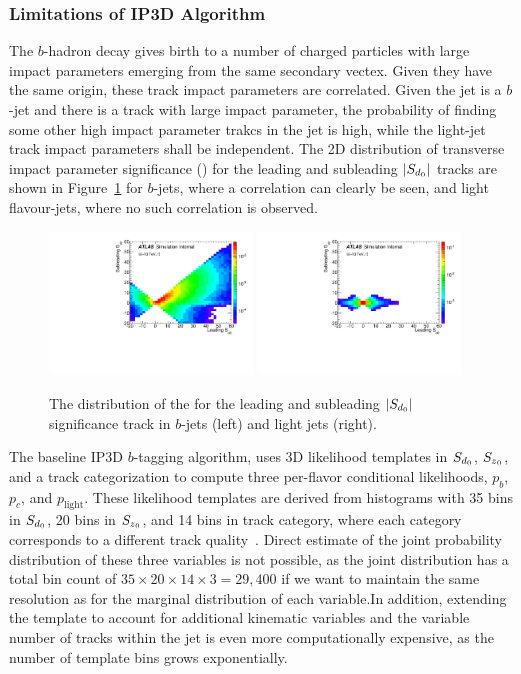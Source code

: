\subsubsection{Limitations of IP3D Algorithm}

The $b$-hadron decay gives birth to a number of charged particles with large impact parameters emerging from the same secondary vectex. Given they have the same origin, these track impact parameters are correlated. Given the jet is a $b$-jet and there is a track with large impact parameter, the probability of finding some other high impact parameter trakcs in the jet is high, while the light-jet track impact parameters shall be independent. The 2D distribution of transverse impact parameter significance (\sdip) for the leading and subleading $|S_{d{_0}}|$ tracks are shown in Figure~\ref{fig:ip_corr} for $b$-jets, where a correlation can clearly be seen, and light flavour-jets, where no such correlation is observed.

\begin{figure}[htbp]
  \centering
   \includegraphics[width=0.48\textwidth]{figures/RNN/Sd0_2d_B.pdf}
 \includegraphics[width=0.48\textwidth]{figures/RNN/Sd0_2d_L.pdf}
\caption{The distribution of the \sdip for the leading and subleading $|S_{d{_0}}|$ significance track in $b$-jets (left) and light jets (right). }
  \label{fig:ip_corr}
\end{figure}


The baseline IP3D $b$-tagging algorithm, uses 3D likelihood templates in $S_{d{_0}}$, $S_{z{_0}}$, and a track categorization to compute three per-flavor conditional likelihoods, $p_b$, $p_c$, and $p_{\textrm{light}}$. These likelihood templates are derived from histograms with 35 bins in $S_{d{_0}}$, 20 bins in $S_{z{_0}}$, and 14 bins in track category, where each category corresponds to a different track quality~\cite{ATL-PHYS-PUB-2015-022}. Direct estimate of the joint probability distribution of these three variables is not possible, as the joint distribution has a total bin count of $35 \times 20 \times 14 \times 3 = 29,400$ if we want to maintain the same resolution as for the marginal distribution of each variable.In addition, extending the template to account for additional kinematic variables and the variable number of tracks within the jet is even more computationally expensive, as the number of template bins grows exponentially.

